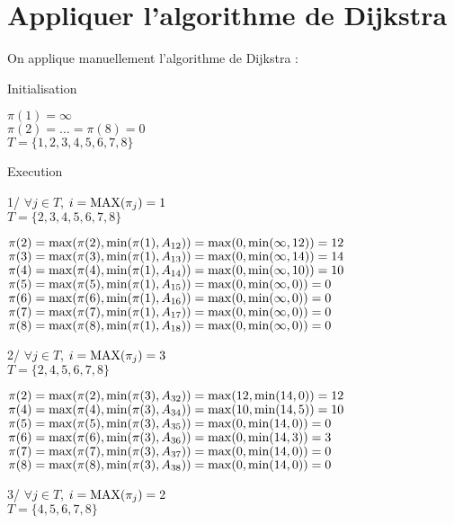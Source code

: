\documentclass{article}
\begin{document}
\section{Appliquer l'algorithme de Dijkstra }

On applique manuellement l'algorithme de Dijkstra :

Initialisation

$ \pi(1) = \infty $\\
$ \pi(2) = \dots = \pi(8) = 0$\\
$ T = \{1,2,3,4,5,6,7,8\}$

Execution

1/
$\forall j \in T$, $i = \operatorname{MAX}(\pi_j) = 1$\\
$ T = \{2,3,4,5,6,7,8\}$

$\pi(2) = \operatorname{max}(\pi(2), \operatorname{min}(\pi(1), A_{12})) = \operatorname{max}(0, \operatorname{min}(\infty,12)) = 12$\\
$\pi(3) = \operatorname{max}(\pi(3), \operatorname{min}(\pi(1), A_{13})) = \operatorname{max}(0, \operatorname{min}(\infty,14)) = 14$\\
$\pi(4) = \operatorname{max}(\pi(4), \operatorname{min}(\pi(1), A_{14})) = \operatorname{max}(0, \operatorname{min}(\infty,10)) = 10$\\
$\pi(5) = \operatorname{max}(\pi(5), \operatorname{min}(\pi(1), A_{15})) = \operatorname{max}(0, \operatorname{min}(\infty,0)) = 0$\\
$\pi(6) = \operatorname{max}(\pi(6), \operatorname{min}(\pi(1), A_{16})) = \operatorname{max}(0, \operatorname{min}(\infty,0)) = 0$\\
$\pi(7) = \operatorname{max}(\pi(7), \operatorname{min}(\pi(1), A_{17})) = \operatorname{max}(0, \operatorname{min}(\infty,0)) = 0$\\
$\pi(8) = \operatorname{max}(\pi(8), \operatorname{min}(\pi(1), A_{18})) = \operatorname{max}(0, \operatorname{min}(\infty,0)) = 0$

2/
$\forall j \in T$, $i = \operatorname{MAX}(\pi_j) = 3$\\
$ T = \{2,4,5,6,7,8\}$

$\pi(2) = \operatorname{max}(\pi(2), \operatorname{min}(\pi(3), A_{32})) = \operatorname{max}(12, \operatorname{min}(14,0)) = 12$\\
$\pi(4) = \operatorname{max}(\pi(4), \operatorname{min}(\pi(3), A_{34})) = \operatorname{max}(10, \operatorname{min}(14,5)) = 10$\\
$\pi(5) = \operatorname{max}(\pi(5), \operatorname{min}(\pi(3), A_{35})) = \operatorname{max}(0, \operatorname{min}(14,0)) = 0$\\
$\pi(6) = \operatorname{max}(\pi(6), \operatorname{min}(\pi(3), A_{36})) = \operatorname{max}(0, \operatorname{min}(14,3)) = 3$\\
$\pi(7) = \operatorname{max}(\pi(7), \operatorname{min}(\pi(3), A_{37})) = \operatorname{max}(0, \operatorname{min}(14,0)) = 0$\\
$\pi(8) = \operatorname{max}(\pi(8), \operatorname{min}(\pi(3), A_{38})) = \operatorname{max}(0, \operatorname{min}(14,0)) = 0$

3/
$\forall j \in T$, $i = \operatorname{MAX}(\pi_j) = 2$\\
$ T = \{4,5,6,7,8\}$
\end{document}

